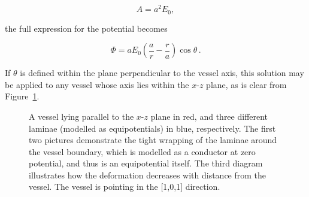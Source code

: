   \begin{equation}
    A = a^2E_0,
  \end{equation}
  
  the full expression for the potential becomes
  
  \begin{equation}
    \Phi = aE_0\left(\frac{a}{r} - \frac{r}{a} \right)\cos\theta\, .
    \label{eqn:potential}
  \end{equation}
  
  If $\theta$ is defined within the plane perpendicular to the vessel axis, this solution may be applied to any vessel whose axis lies within the $x$-$z$ plane, as is clear from Figure~\ref{fig:coplanar}.
  
  \begin{figure}[htbp]
    \centering
    \caption{A vessel lying parallel to the $x$-$z$ plane in red, and three different laminae (modelled as equipotentials) in blue, respectively. The first two pictures demonstrate the tight wrapping of the laminae around the vessel boundary, which is modelled as a conductor at zero potential, and thus is an equipotential itself. The third diagram illustrates how the deformation decreases with distance from the vessel. The vessel is pointing in the [1,0,1] direction.}
    \label{fig:coplanar}
  \end{figure}
  
